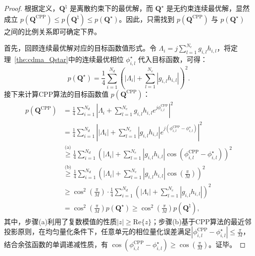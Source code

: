 \begin{proof}
	根据定义，$\bm Q^{\natural}$ 是离散约束下的最优解，而 $\bm Q^\star$ 是无约束连续最优解，显然成立 $p(\bm Q^{\text{CPP}}) \leq p(\bm Q^{\natural}) \leq p(\bm Q^\star)$。因此，只需找到 $p(\bm Q^{\text{CPP}})$ 与 $p(\bm Q^\star)$ 之间的比例关系即可确定下界。
	
	首先，回顾连续最优解对应的目标函数值形式。令 $\Lambda_i = j \sum_{l=1}^{N_{e}} g_{i,l} h_{i,l}$，将定理~\ref{the:cdma_Qstar}中的连续最优相位 $\phi_{i,l}^\star$ 代入目标函数，可得：
	\begin{equation}\label{eq:ddma_p_Qstar}
		p(\bm Q^\star) = \frac{1}{4}\sum_{i=1}^{N_{d}} \left( |\Lambda_i| + \sum_{l=1}^{N_{e}} |g_{i,l} h_{i, l}| \right)^{2}.
	\end{equation}
	接下来计算CPP算法的目标函数值 $p(\bm Q^{\text{CPP}})$：
	\begin{subequations}
		\begin{align}
			p(\bm Q^{\text{CPP}})
			&= \frac{1}{4}\sum_{i=1}^{N_{d}}\left| \Lambda_i +\sum_{l=1}^{N_{e}} g_{i,l} h_{i, l} e^{j \phi_{i,l}^{\text{CPP}}} \right|^{2} \\
			&= \frac{1}{4}\sum_{i=1}^{N_{d}} \left| |\Lambda_i| + \sum_{l=1}^{N_{e}} |g_{i,l} h_{i, l}| e^{j( \phi_{i,l}^{\text{CPP}} - \phi_{i,l}^\star)} \right|^{2} \\
			&\overset{\text{(a)}}{\geq} \frac{1}{4}\sum_{i=1}^{N_{d}} \left( |\Lambda_i| + \sum_{l=1}^{N_{e}} |g_{i,l} h_{i, l}| \cos( \phi_{i,l}^{\text{CPP}} - \phi_{i,l}^\star) \right)^{2} \\
			&\overset{\text{(b)}}{\geq} \frac{1}{4}\sum_{i=1}^{N_{d}} \left( |\Lambda_i| + \sum_{l=1}^{N_{e}} |g_{i,l} h_{i, l}| \cos \left(\frac{\pi}{M}\right) \right)^{2} \\
			&\geq \cos^2 \left(\frac{\pi}{M}\right) \cdot \frac{1}{4} \sum_{i=1}^{N_{d}} \left( |\Lambda_i| + \sum_{l=1}^{N_{e}} |g_{i,l} h_{i, l}|\right)^{2} \\
			&= \cos^2\left(\frac{\pi}{M}\right) p(\bm Q^\star) \geq \cos^2\left(\frac{\pi}{M}\right) p(\bm Q^\natural),
		\end{align}
	\end{subequations}
	其中，步骤(a)利用了复数模值的性质$|z| \ge \text{Re}\{z\}$；步骤(b)基于CPP算法的最近邻投影原则，在均匀量化条件下，任意单元的相位量化误差满足$|\phi_{i,l}^{\text{CPP}} - \phi_{i,l}^\star| \le \frac{\pi}{M}$，结合余弦函数的单调递减性质，有 $\cos( \phi_{i,l}^{\text{CPP}} - \phi_{i,l}^\star) \ge \cos(\frac{\pi}{M})$。证毕。
\end{proof}


